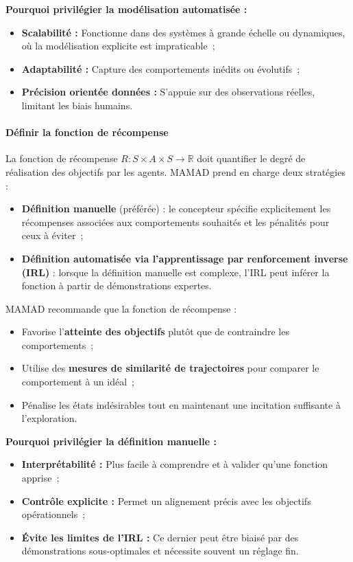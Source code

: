 \vspace{0.4em}
\noindent \textbf{Pourquoi privilégier la modélisation automatisée :}
\begin{itemize}
    \item \textbf{Scalabilité :} Fonctionne dans des systèmes à grande échelle ou dynamiques, où la modélisation explicite est impraticable~;
    \item \textbf{Adaptabilité :} Capture des comportements inédits ou évolutifs~;
    \item \textbf{Précision orientée données :} S'appuie sur des observations réelles, limitant les biais humains.
\end{itemize}

\paragraph{Définir la fonction de récompense}

La fonction de récompense $R: S \times A \times S \to \mathbb{R}$ doit quantifier le degré de réalisation des objectifs par les agents. MAMAD prend en charge deux stratégies :

\begin{itemize}
    \item \textbf{Définition manuelle} (préférée) : le concepteur spécifie explicitement les récompenses associées aux comportements souhaités et les pénalités pour ceux à éviter~;
    \item \textbf{Définition automatisée via l'apprentissage par renforcement inverse (IRL)} : lorsque la définition manuelle est complexe, l'IRL peut inférer la fonction à partir de démonstrations expertes.
\end{itemize}

MAMAD recommande que la fonction de récompense :
\begin{itemize}
    \item Favorise l'\textbf{atteinte des objectifs} plutôt que de contraindre les comportements~;
    \item Utilise des \textbf{mesures de similarité de trajectoires} pour comparer le comportement à un idéal~;
    \item Pénalise les états indésirables tout en maintenant une incitation suffisante à l'exploration.
\end{itemize}

\vspace{0.4em}
\noindent \textbf{Pourquoi privilégier la définition manuelle :}
\begin{itemize}
    \item \textbf{Interprétabilité :} Plus facile à comprendre et à valider qu'une fonction apprise~;
    \item \textbf{Contrôle explicite :} Permet un alignement précis avec les objectifs opérationnels~;
    \item \textbf{Évite les limites de l'IRL :} Ce dernier peut être biaisé par des démonstrations sous-optimales et nécessite souvent un réglage fin.
\end{itemize}

